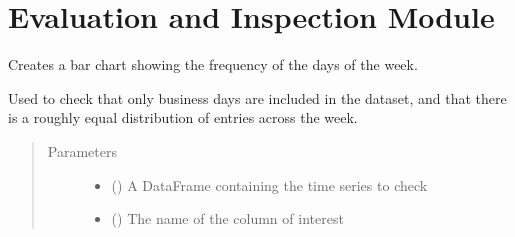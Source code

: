 \documentclass[letterpaper,10pt,english]{sphinxmanual}
\begin{document}
\chapter{Evaluation and Inspection Module}
\label{\detokenize{index:module-Forecaster.eval_inspect}}\label{\detokenize{index:evaluation-and-inspection-module}}

\begin{fulllineitems}
\label{\detokenize{index:Forecaster.eval_inspect.check_day_frequency}}
Creates a bar chart showing the frequency of the days of the week.

Used to check that only business days are included in the dataset, and
that there is a roughly equal distribution of entries across the week.
\begin{quote}\begin{description}
\item[{Parameters}] \leavevmode\begin{itemize}
\item {} 
 () \textendash{} A DataFrame containing the time series to check

\item {} 
 () \textendash{} The name of the column of interest

\end{itemize}

\end{description}\end{quote}

\end{fulllineitems}

\end{document}
